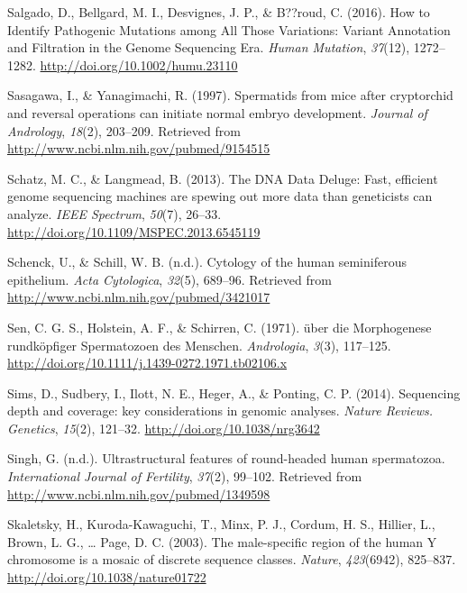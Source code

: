 \documentclass[12pt,twoside]{reedthesis}
\theoremstyle{definition}
\theoremstyle{definition}
\theoremstyle{remark}
\begin{document}
  \hypertarget{ref-Salgado2016}{}
  Salgado, D., Bellgard, M. I., Desvignes, J. P., \& B??roud, C. (2016).
  How to Identify Pathogenic Mutations among All Those Variations: Variant
  Annotation and Filtration in the Genome Sequencing Era. \emph{Human
  Mutation}, \emph{37}(12), 1272--1282.
  \url{http://doi.org/10.1002/humu.23110}
  
  \hypertarget{ref-Sasagawa}{}
  Sasagawa, I., \& Yanagimachi, R. (1997). Spermatids from mice after
  cryptorchid and reversal operations can initiate normal embryo
  development. \emph{Journal of Andrology}, \emph{18}(2), 203--209.
  Retrieved from \url{http://www.ncbi.nlm.nih.gov/pubmed/9154515}
  
  \hypertarget{ref-Schatz2013}{}
  Schatz, M. C., \& Langmead, B. (2013). The DNA Data Deluge: Fast,
  efficient genome sequencing machines are spewing out more data than
  geneticists can analyze. \emph{IEEE Spectrum}, \emph{50}(7), 26--33.
  \url{http://doi.org/10.1109/MSPEC.2013.6545119}
  
  \hypertarget{ref-Schenck}{}
  Schenck, U., \& Schill, W. B. (n.d.). Cytology of the human seminiferous
  epithelium. \emph{Acta Cytologica}, \emph{32}(5), 689--96. Retrieved
  from \url{http://www.ncbi.nlm.nih.gov/pubmed/3421017}
  
  \hypertarget{ref-Sen2009}{}
  Sen, C. G. S., Holstein, A. F., \& Schirren, C. (1971). über die
  Morphogenese rundköpfiger Spermatozoen des Menschen. \emph{Andrologia},
  \emph{3}(3), 117--125.
  \url{http://doi.org/10.1111/j.1439-0272.1971.tb02106.x}
  
  \hypertarget{ref-Sims2014}{}
  Sims, D., Sudbery, I., Ilott, N. E., Heger, A., \& Ponting, C. P.
  (2014). Sequencing depth and coverage: key considerations in genomic
  analyses. \emph{Nature Reviews. Genetics}, \emph{15}(2), 121--32.
  \url{http://doi.org/10.1038/nrg3642}
  
  \hypertarget{ref-Singh}{}
  Singh, G. (n.d.). Ultrastructural features of round-headed human
  spermatozoa. \emph{International Journal of Fertility}, \emph{37}(2),
  99--102. Retrieved from \url{http://www.ncbi.nlm.nih.gov/pubmed/1349598}
  
  \hypertarget{ref-Skaletsky2003}{}
  Skaletsky, H., Kuroda-Kawaguchi, T., Minx, P. J., Cordum, H. S.,
  Hillier, L., Brown, L. G., \ldots{} Page, D. C. (2003). The
  male-specific region of the human Y chromosome is a mosaic of discrete
  sequence classes. \emph{Nature}, \emph{423}(6942), 825--837.
  \url{http://doi.org/10.1038/nature01722}
  
\end{document}
